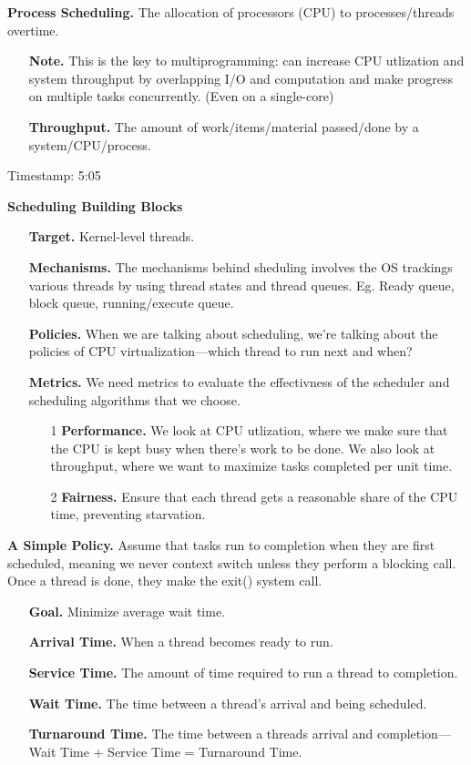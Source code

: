 \documentclass[12pt]{article}
\begin{document}
{\bf Process Scheduling.} {The allocation of processors (CPU) to processes/threads overtime.}
    \begin{enumerate}
        \item[] {\bf Note.} {This is the key to multiprogramming: can increase CPU utlization and system throughput by overlapping I/O and computation and make progress on multiple tasks concurrently. (Even on a single-core)}
        \item[] {\bf Throughput.} {The amount of work/items/material passed/done by a system/CPU/process.}
    \end{enumerate}
Timestamp: 5:05 

{\bf Scheduling Building Blocks}
    \begin{enumerate}
        \item[]{\bf Target.} {Kernel-level threads.}
        \item[]{\bf Mechanisms.} {The mechanisms behind sheduling involves the OS trackings various threads by using thread states and thread queues. Eg. Ready queue, block queue, running/execute queue.}  
        \item[]{\bf Policies.} {When we are talking about scheduling, we're talking about the policies of CPU virtualization––which thread to run next and when?} 
        \item[]{\bf Metrics.} {We need metrics to evaluate the effectivness of the scheduler and scheduling algorithms that we choose.}
        \begin{enumerate}
            \item[1] {\bf Performance.} {We look at CPU utlization, where we make sure that the CPU is kept busy when there's work to be done. We also look at throughput, where we want to maximize tasks completed per unit time.} 
            \item[2] {\bf Fairness.} {Ensure that each thread gets a reasonable share of the CPU time, preventing starvation.} 
        \end{enumerate}
    \end{enumerate}

{\bf A Simple Policy.} {Assume that tasks run to completion when they are first scheduled, meaning we never context switch unless they perform a blocking call. Once a thread is done, they make the exit() system call.}
    \begin{enumerate}
        \item[]{\bf Goal.} {Minimize average wait time.}
        \item[]{\bf Arrival Time.} {When a thread becomes ready to run.}
        \item[]{\bf Service Time.} {The amount of time required to run a thread to completion.}
        \item[]{\bf Wait Time.} {The time between a thread's arrival and being scheduled.}
        \item[]{\bf Turnaround Time.} {The time between a threads arrival and completion–– Wait Time + Service Time = Turnaround Time.}  
    \end{enumerate}
\end{document}
